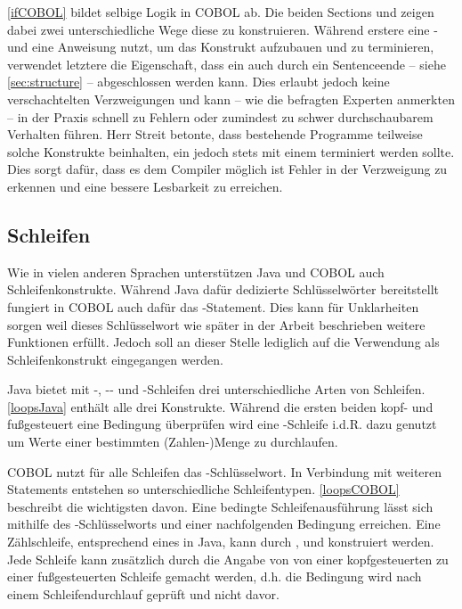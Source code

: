 \autoref{ifCOBOL} bildet selbige Logik in COBOL ab. Die beiden Sections  und  zeigen dabei zwei unterschiedliche Wege diese zu konstruieren. Während erstere eine - und eine  Anweisung nutzt, um das Konstrukt aufzubauen und zu terminieren, verwendet letztere die Eigenschaft, dass ein  auch durch ein Sentenceende -- siehe \autoref{sec:structure} -- abgeschlossen werden kann. Dies erlaubt jedoch keine verschachtelten Verzweigungen und kann -- wie die befragten Experten anmerkten -- in der Praxis schnell zu Fehlern oder zumindest zu schwer durchschaubarem Verhalten führen. Herr Streit betonte, dass bestehende Programme teilweise solche Konstrukte beinhalten, ein  jedoch stets mit einem  terminiert werden sollte. Dies sorgt dafür, dass es dem Compiler möglich ist Fehler in der Verzweigung zu erkennen und eine bessere Lesbarkeit zu erreichen.

\subsection{Schleifen}

Wie in vielen anderen Sprachen unterstützen Java und COBOL auch Schleifenkonstrukte. Während Java dafür dedizierte Schlüsselwörter bereitstellt fungiert in COBOL auch dafür das -Statement. Dies kann für Unklarheiten sorgen weil dieses Schlüsselwort wie später in der Arbeit beschrieben weitere Funktionen erfüllt. Jedoch soll an dieser Stelle lediglich auf die Verwendung als Schleifenkonstrukt eingegangen werden.

Java bietet mit -, -- und -Schleifen drei unterschiedliche Arten von Schleifen. \autoref{loopsJava} enthält alle drei Konstrukte. Während die ersten beiden kopf- und fußgesteuert eine Bedingung überprüfen wird eine -Schleife i.d.R. dazu genutzt um Werte einer bestimmten (Zahlen-)Menge zu durchlaufen.


COBOL nutzt für alle Schleifen das -Schlüsselwort. In Verbindung mit weiteren Statements entstehen so unterschiedliche Schleifentypen. \autoref{loopsCOBOL} beschreibt die wichtigsten davon. Eine bedingte Schleifenausführung lässt sich mithilfe des -Schlüsselworts und einer nachfolgenden Bedingung erreichen. Eine Zählschleife, entsprechend eines  in Java, kann durch ,  und  konstruiert werden. Jede Schleife kann zusätzlich durch die Angabe von  von einer kopfgesteuerten zu einer fußgesteuerten Schleife gemacht werden, d.h. die Bedingung wird nach einem Schleifendurchlauf geprüft und nicht davor.

